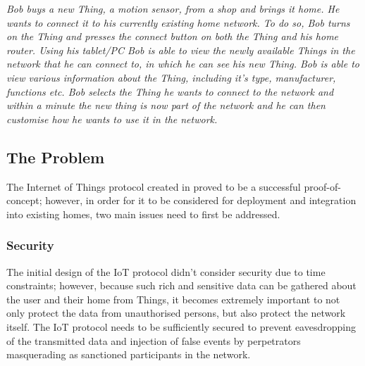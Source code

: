 \documentclass{mprop}
\begin{document}
\textit{Bob buys a new Thing, a motion sensor, from a shop and brings it home. He wants to connect it to his currently existing home network. To do so, Bob turns on the Thing and presses the connect button on both the Thing and his home router. Using his tablet/PC Bob is able to view the newly available Things in the network that he can connect to, in which he can see his new Thing. Bob is able to view various information about the Thing, including it's type, manufacturer, functions etc. Bob selects the Thing he wants to connect to the network and within a minute the new thing is now part of the network and he can then customise how he wants to use it in the network.}

\subsection{The Problem} %
\label{sub:the_problem}
The Internet of Things protocol created in \cite{KNoT} proved to be a successful proof-of-concept; however, in order for it to be considered for deployment and integration into existing homes, two main issues need to first be addressed.

\subsubsection{Security} %
\label{ssub:security}

The initial design of the IoT protocol didn't consider security due to time constraints; however, because such rich and sensitive data can be gathered about the user and their home from Things, it becomes extremely important to not only protect the data from unauthorised persons, but also protect the network itself. The IoT protocol needs to be sufficiently secured to prevent eavesdropping of the transmitted data and injection of false events by perpetrators masquerading as sanctioned participants in the network. 
\end{document}
